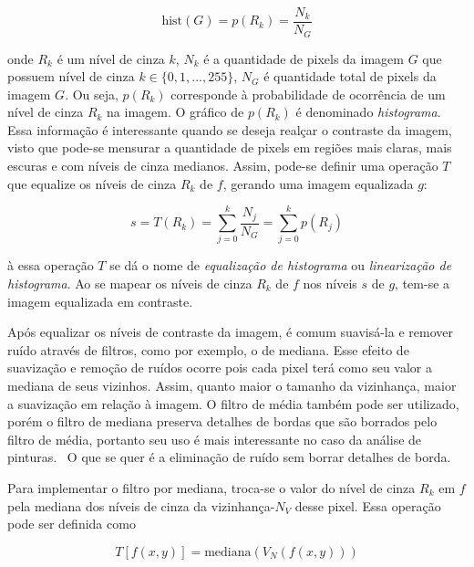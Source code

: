 \begin{equation}
\text{hist}(G) = p(R_k) = \frac{N_k}{N_G}
\end{equation}

\noindent onde $R_k$ é um nível de cinza $k$, $N_k$ é a quantidade de
pixels da imagem $G$ que possuem nível de cinza $k \in \{0, 1, ...,
255\}$, $N_G$ é quantidade total de pixels da imagem $G$. Ou seja,
$p(R_k)$ corresponde à probabilidade de ocorrência de um nível de
cinza $R_k$ na imagem. O gráfico de $p(R_k)$ é denominado
\emph{histograma}. Essa informação é interessante quando se deseja
realçar o contraste da imagem, visto que pode-se mensurar a quantidade
de pixels em regiões mais claras, mais escuras e com níveis de cinza
medianos. Assim, pode-se definir uma operação $T$ que equalize os
níveis de cinza $R_k$ de $f$, gerando uma imagem equalizada $g$:

\begin{equation}
s = T(R_k) = \sum_{j=0}^k \frac{N_j}{N_G} = \sum_{j=0}^k p(R_j)
\end{equation}

\noindent à essa operação $T$ se dá o nome de \emph{equalização de
  histograma} ou \emph{linearização de histograma}. Ao se mapear os
níveis de cinza $R_k$ de $f$ nos níveis $s$ de $g$, tem-se a imagem
equalizada em contraste.


Após equalizar os níveis de contraste da imagem, é comum suavisá-la e
remover ruído através de filtros, como por exemplo, o de mediana. Esse
efeito de suavização e remoção de ruídos ocorre pois cada pixel terá
como seu valor a mediana de seus vizinhos. Assim, quanto maior o
tamanho da vizinhança, maior a suavização em relação à imagem. O
filtro de média também pode ser utilizado, porém o filtro de mediana
preserva detalhes de bordas que são borrados pelo filtro de média,
portanto seu uso é mais interessante no caso da análise de
pinturas.~\cite{gonzalez} O que se quer é a eliminação de ruído sem
borrar detalhes de borda.

Para implementar o filtro por mediana, troca-se o valor do nível de
cinza $R_k$ em $f$ pela mediana dos níveis de cinza da
vizinhança-$N_V$ desse pixel. Essa operação pode ser definida como

\begin{equation}
  T[f(x,y)] = \text{mediana}(V_N(f(x,y)))
\end{equation}

